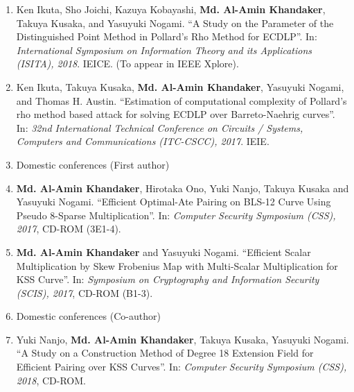 \begin{enumerate}
	\item Ken Ikuta, Sho Joichi, Kazuya Kobayashi, \textbf{Md. Al-Amin Khandaker}, Takuya Kusaka, and Yasuyuki Nogami. ``A Study on the Parameter of the Distinguished Point Method in Pollard's Rho Method for ECDLP''. In: \textit{International Symposium on Information Theory and its Applications (ISITA), 2018}. IEICE. (To appear in IEEE Xplore).	
	
	\item Ken Ikuta, Takuya Kusaka, \textbf{Md. Al-Amin Khandaker}, Yasuyuki Nogami, and Thomas H. Austin. ``Estimation of computational complexity of Pollard's rho method based attack for solving ECDLP over Barreto-Naehrig curves''. In: \textit{32nd International Technical Conference on Circuits / Systems, Computers and Communications (ITC-CSCC), 2017}. IEIE. 
\vspace{10mm}
\large
\item [] \Large Domestic conferences (First author)
	\normalsize
	
	\item \textbf{Md. Al-Amin Khandaker}, Hirotaka Ono, Yuki Nanjo, Takuya Kusaka and Yasuyuki Nogami. ``Efficient Optimal-Ate Pairing on BLS-12 Curve Using Pseudo 8-Sparse Multiplication''. In: \textit{Computer Security Symposium  (CSS),  2017}, CD-ROM (3E1-4). 
	
	\item \textbf{Md. Al-Amin Khandaker} and Yasuyuki Nogami. ``Efficient Scalar Multiplication by Skew Frobenius Map with Multi-Scalar Multiplication for KSS Curve''. In: \textit{Symposium on Cryptography and Information Security (SCIS),  2017}, CD-ROM (B1-3). 

	\vspace{10mm}
	\large
	\item[] \Large Domestic conferences (Co-author)
	\normalsize
	\item Yuki Nanjo,  \textbf{Md. Al-Amin Khandaker}, Takuya Kusaka, Yasuyuki Nogami. ``A Study on a Construction Method of Degree 18 Extension Field for Efficient Pairing over KSS Curves''. In: \textit{Computer Security Symposium  (CSS),  2018}, CD-ROM. 
	

\end{enumerate}
